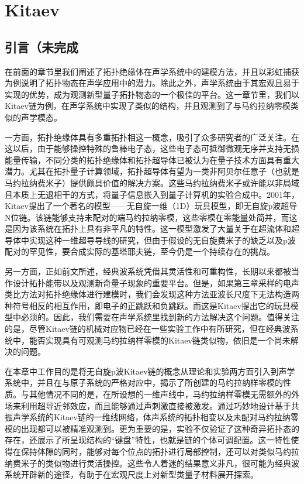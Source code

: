 \chapter{Kitaev}

\section{引言（未完成}

在前面的章节里我们阐述了拓扑绝缘体在声学系统中的建模方法，并且以彩虹捕获为例说明了拓扑物态在声学应用中的潜力。除此之外，声学系统由于其宏观且易于实现的优势，成为观测新型量子拓扑物态的一个极佳的平台。这一章节里，我们以Kitaev链为例，在声学系统中实现了类似的结构，并且观测到了与马约拉纳零模类似的声学模态。

一方面，拓扑绝缘体具有多重拓扑相这一概念，吸引了众多研究者的广泛关注。在这以后，由于能够操控特殊的鲁棒电子态，这些电子态可抵御微观无序并支持无损能量传输，不同分类的拓扑绝缘体和拓扑超导体已被认为在量子技术方面具有重大潜力。尤其在拓扑量子计算领域，拓扑超导体有望为一类非阿贝尔任意子（也就是马约拉纳费米子）提供颇具价值的解决方案。这些马约拉纳费米子或许能以非局域且本质上无退相干的方式，将量子信息嵌入到量子计算机的实验合成中\cite{r31,r32,r33}。2001年，Kitaev提出了一个著名的模型——无自旋一维（1D）玩具模型，即无自旋p波超导N位链。该链能够支持未配对的端马约拉纳零模，这些零模在零能量处简并，而这是因为该系统在拓扑上具有非平凡的特性\cite{r4}。这一模型激发了大量关于在超流体和超导体中实现这种一维超导导线的研究\cite{r51,r52,r53,r54,r55,r56,r57,r58,r59,r510}，但由于假设的无自旋费米子的缺乏以及p波配对的罕见性，要合成实际的基塔耶夫链，至今仍是一个持续存在的挑战。

另一方面，正如前文所述，经典波系统凭借其灵活性和可重构性，长期以来都被当作设计拓扑能带以及观测新奇量子现象的重要平台。但是，如果第三章采样的电声类比方法对拓扑绝缘体进行建模时，我们会发现这种方法亚波长尺度下无法构造两种符号相反的相互作用，即电子的正跳跃和负跳跃。而这是Kitaev提出它的玩具模型中必须的。因此，我们需要在声学系统里找到新的方法解决这个问题。值得关注的是，尽管Kitaev链的机械对应物已经在一些实验工作中有所研究\cite{C54}，但在经典波系统中，能否实现具有可观测马约拉纳样零模的Kitaev链类似物，依旧是一个尚未解决的问题。

在本章中工作目的是将无自旋p波Kitaev链的概念从理论和实验两方面引入到声学系统中，并且在与原子系统的严格对应中，揭示了所创建的马约拉纳样零模的性质。与其他情况不同的是，在所设想的一维声线中，马约拉纳样零模无需额外的外场来利用超导近邻效应，而且能够通过声刺激直接被激发。通过巧妙地设计基于共振声学系统的Kitaev链的一维线网络，体声系统的拓扑相变以及未配对马约拉纳零模的出现都可以被精准观测到。更为重要的是，实验不仅验证了这种奇异拓扑态的存在，还展示了所呈现结构的“键盘”特性，也就是链的个体可调配置。这一特性使得在保持体隙的同时，能够对每个位点的拓扑进行局部控制，还可以对类似马约拉纳费米子的类似物进行灵活操控。这些令人着迷的结果意义非凡，很可能为经典波系统开辟新的途径，有助于在宏观尺度上对新型类量子材料展开探索。

